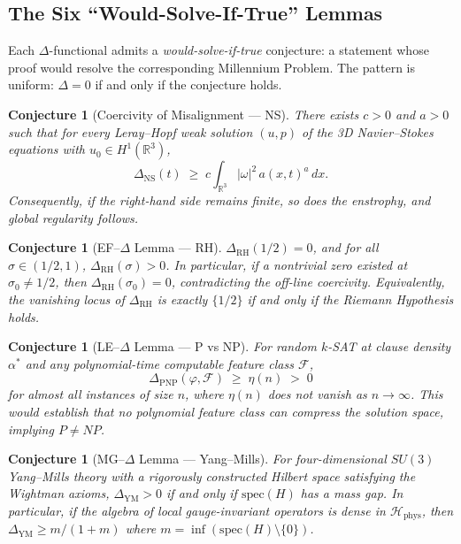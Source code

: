 \documentclass[11pt]{article}
\newtheorem{conjecture}[theorem]{Conjecture}
\begin{document}
\subsection{The Six ``Would-Solve-If-True'' Lemmas}
\label{subsec:six-lemmas}

Each $\Delta$-functional admits a \emph{would-solve-if-true} conjecture:
a statement whose proof would resolve the corresponding Millennium Problem.
The pattern is uniform: $\Delta = 0$ if and only if the conjecture holds.

\begin{conjecture}[Coercivity of Misalignment --- NS]
\label{conj:ns}
There exists $c > 0$ and $a > 0$ such that for every Leray--Hopf weak
solution $(u, p)$ of the 3D Navier--Stokes equations with
$u_0 \in H^1(\mathbb{R}^3)$,
\[
  \Delta_{\mathrm{NS}}(t) \;\geq\; c \int_{\mathbb{R}^3}
  |\omega|^2\, a(x,t)^a\, dx.
\]
Consequently, if the right-hand side remains finite, so does the
enstrophy, and global regularity follows.
\end{conjecture}

\begin{conjecture}[EF--$\Delta$ Lemma --- RH]
\label{conj:rh}
$\Delta_{\mathrm{RH}}(1/2) = 0$, and for all
$\sigma \in (1/2, 1)$, $\Delta_{\mathrm{RH}}(\sigma) > 0$.
In particular, if a nontrivial zero existed at $\sigma_0 \neq 1/2$,
then $\Delta_{\mathrm{RH}}(\sigma_0) = 0$, contradicting the
off-line coercivity.  Equivalently, the vanishing locus of
$\Delta_{\mathrm{RH}}$ is exactly $\{1/2\}$ if and only if the
Riemann Hypothesis holds.
\end{conjecture}

\begin{conjecture}[LE--$\Delta$ Lemma --- P vs NP]
\label{conj:pnp}
For random $k$-SAT at clause density $\alpha^*$ and any
polynomial-time computable feature class $\mathcal{F}$,
\[
  \Delta_{\mathrm{PNP}}(\varphi, \mathcal{F})
  \;\geq\; \eta(n) \;>\; 0
\]
for almost all instances of size $n$, where $\eta(n)$ does not
vanish as $n \to \infty$.  This would establish that no polynomial
feature class can compress the solution space, implying $P \neq NP$.
\end{conjecture}

\begin{conjecture}[MG--$\Delta$ Lemma --- Yang--Mills]
\label{conj:ym}
For four-dimensional $SU(3)$ Yang--Mills theory with a rigorously
constructed Hilbert space satisfying the Wightman axioms,
$\Delta_{\mathrm{YM}} > 0$ if and only if $\mathrm{spec}(H)$
has a mass gap.  In particular, if the algebra of local
gauge-invariant operators is dense in $\mathcal{H}_{\mathrm{phys}}$,
then $\Delta_{\mathrm{YM}} \geq m / (1 + m)$ where
$m = \inf(\mathrm{spec}(H) \setminus \{0\})$.
\end{conjecture}
\end{document}
